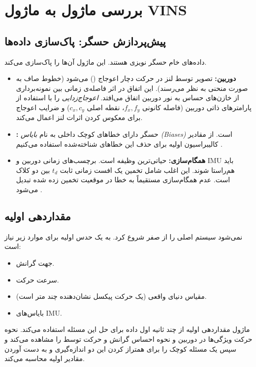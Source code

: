 \documentclass[11pt, a4paper]{article}
\begin{document}
	\section{بررسی ماژول به ماژول \gls{VINS}}
	\subsection{پیش‌پردازش حسگر: پاک‌سازی داده‌ها}
	داده‌های خام حسگر نویزی هستند. این ماژول آن‌ها را پاک‌سازی می‌کند.
	\begin{itemize}
		\item \textbf{دوربین:} 
		تصویر توسط لنز در حرکت دچار اعوجاج
		()
		می‌شود (خطوط صاف به صورت منحنی به نظر می‌رسند).
		این اتفاق در اثر فاصله‌ی زمانی بین نمونه‌برداری از خازن‌های حساس به نور دوربین اتفاق می‌افتد.
		\emph{اعوجاج‌زدایی} را با استفاده از پارامترهای ذاتی دوربین (فاصله کانونی $f_x, f_y$، نقطه اصلی $c_x, c_y$) و ضرایب اعوجاج  برای معکوس کردن اثرات لنز اعمال می‌کند.
		\item \textbf{:} حسگر دارای خطاهای کوچک داخلی به نام \emph{بایاس (Biases)} است. از مقادیر کالیبراسیون اولیه برای حذف این خطاهای شناخته‌شده استفاده می‌کنیم \cite{rehder2016kalibr}.
		\item \textbf{همگام‌سازی:}
		حیاتی‌ترین وظیفه است. برچسب‌های زمانی دوربین و \gls{IMU} باید هم‌راستا شوند. این اغلب شامل تخمین یک افست زمانی ثابت $t_d$ بین دو کلاک است. عدم همگام‌سازی مستقیماً به خطا در موقعیت تخمین زده شده تبدیل می‌شود
		\cite{qin2018online}.
	\end{itemize}
	
	\subsection{مقداردهی اولیه}
	نمی‌شود سیستم اصلی را از صفر شروع کرد. به یک حدس اولیه برای موارد زیر نیاز است:
	\begin{itemize}
		\item جهت گرانش.
		\item سرعت حرکت.
		\item مقیاس دنیای واقعی (یک حرکت پیکسل نشان‌دهنده چند متر است).
		\item بایاس‌های \gls{IMU}.
	\end{itemize}
	ماژول مقداردهی اولیه از چند ثانیه اول داده برای حل این مسئله استفاده می‌کند. نحوه حرکت ویژگی‌ها در دوربین و نحوه احساس گرانش و حرکت توسط  را مشاهده می‌کند و سپس یک مسئله کوچک را برای همتراز کردن این دو اندازه‌گیری و به دست آوردن مقادیر اولیه محاسبه می‌کند.
	
	
\end{document}
